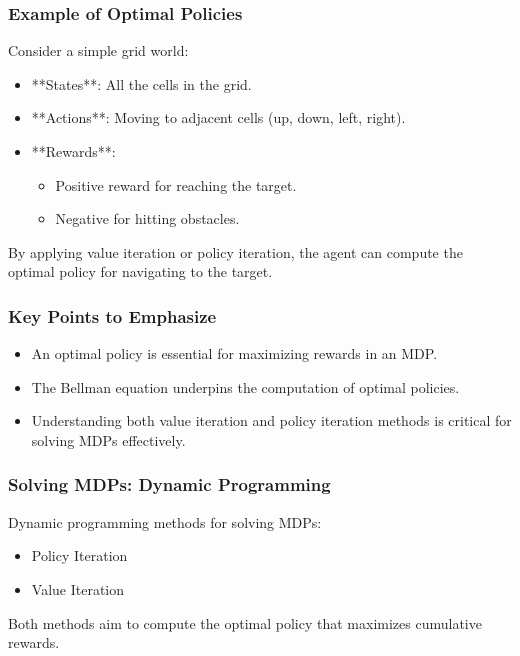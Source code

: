 \documentclass[aspectratio=169]{beamer}
\begin{document}
\begin{frame}[fragile]
  \frametitle{Example of Optimal Policies}
  Consider a simple grid world:
  \begin{itemize}
    \item **States**: All the cells in the grid.
    \item **Actions**: Moving to adjacent cells (up, down, left, right).
    \item **Rewards**: 
      \begin{itemize}
        \item Positive reward for reaching the target.
        \item Negative for hitting obstacles.
      \end{itemize}
  \end{itemize}
  
  By applying value iteration or policy iteration, the agent can compute the optimal policy for navigating to the target.
\end{frame}

\begin{frame}[fragile]
  \frametitle{Key Points to Emphasize}
  \begin{itemize}
    \item An optimal policy is essential for maximizing rewards in an MDP.
    \item The Bellman equation underpins the computation of optimal policies.
    \item Understanding both value iteration and policy iteration methods is critical for solving MDPs effectively.
  \end{itemize}
\end{frame}

\begin{frame}[fragile]
    \frametitle{Solving MDPs: Dynamic Programming}
    Dynamic programming methods for solving MDPs:
    \begin{itemize}
        \item Policy Iteration
        \item Value Iteration
    \end{itemize}
    Both methods aim to compute the optimal policy that maximizes cumulative rewards.
\end{frame}
\end{document}
